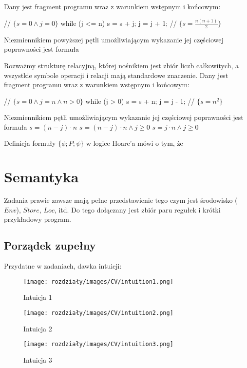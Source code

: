 \begin{problems}
    \prob Dany jest fragment programu wraz z warunkiem wstępnym i końcowym:
    \begin{cpp}
        // $\{s = 0 \land j = 0\}$
        while (j <= n) {
            s = s + j;
            j = j + 1;
        }
        // $\{s = \frac{n(n + 1)}{2}\}$
    \end{cpp}
    Niezmiennikiem powyższej pętli umożliwiającym wykazanie jej częściowej poprawności jest formuła

    \prob Rozważmy strukturę relacyjną, której nośnikiem jest zbiór liczb całkowitych, a wszystkie symbole operacji i relacji mają standardowe znaczenie. Dany jest fragment programu wraz z warunkiem wstępnym i końcowym:
    \begin{cpp}
        // $\{s = 0 \land j = n \land n > 0\}$
        while (j > 0) {
            s = s + n;
            j = j - 1;
        }
        // $\{s = n^2\}$
    \end{cpp}
    Niezmiennikiem pętli umożliwiającym wykazanie jej częściowej poprawności jest formuła
    \answers
    {$s = (n - j) \cdot n$}
    {$s = (n - j) \cdot n \wedge j \geq 0$}
    {$s = j \cdot n \wedge j \geq 0$}

    \prob Definicja formuły $\{\phi; P; \psi\}$ w logice Hoare’a mówi o tym, że
\end{problems}

\section{Semantyka}
Zadania prawie zawsze mają pełne przedstawienie tego czym jest środowisko ($Env$), $Store$, $Loc$, itd. Do tego dołączany jest zbiór paru regułek i krótki przykładowy program.

\subsection{Porządek zupełny}
Przydatne w zadaniach, dawka intuicji:
\begin{figure}[H]
    \centering
    \texttt{[image: rozdziały/images/CV/intuition1.png]}
    \caption{Intuicja 1}
\end{figure}
\begin{figure}[H]
    \centering
    \texttt{[image: rozdziały/images/CV/intuition2.png]}
    \caption{Intuicja 2}
\end{figure}
\begin{figure}[H]
    \centering
    \texttt{[image: rozdziały/images/CV/intuition3.png]}
    \caption{Intuicja 3}
\end{figure}

